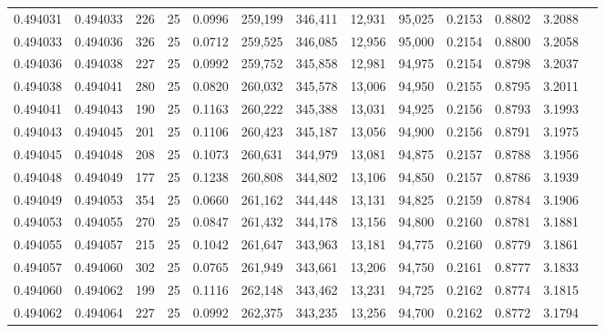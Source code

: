 \begin{tabular}{rrrrrrrrrrrrr}
0.494031 & 0.494033 &   226 &  25 &                                     0.0996 & 259,199 & 346,411 &  12,931 &  95,025 & 0.2153 & 0.8802 & 3.2088 \\
0.494033 & 0.494036 &   326 &  25 &                                     0.0712 & 259,525 & 346,085 &  12,956 &  95,000 & 0.2154 & 0.8800 & 3.2058 \\
0.494036 & 0.494038 &   227 &  25 &                                     0.0992 & 259,752 & 345,858 &  12,981 &  94,975 & 0.2154 & 0.8798 & 3.2037 \\
0.494038 & 0.494041 &   280 &  25 &                                     0.0820 & 260,032 & 345,578 &  13,006 &  94,950 & 0.2155 & 0.8795 & 3.2011 \\
0.494041 & 0.494043 &   190 &  25 &                                     0.1163 & 260,222 & 345,388 &  13,031 &  94,925 & 0.2156 & 0.8793 & 3.1993 \\
0.494043 & 0.494045 &   201 &  25 &                                     0.1106 & 260,423 & 345,187 &  13,056 &  94,900 & 0.2156 & 0.8791 & 3.1975 \\
0.494045 & 0.494048 &   208 &  25 &                                     0.1073 & 260,631 & 344,979 &  13,081 &  94,875 & 0.2157 & 0.8788 & 3.1956 \\
0.494048 & 0.494049 &   177 &  25 &                                     0.1238 & 260,808 & 344,802 &  13,106 &  94,850 & 0.2157 & 0.8786 & 3.1939 \\
0.494049 & 0.494053 &   354 &  25 &                                     0.0660 & 261,162 & 344,448 &  13,131 &  94,825 & 0.2159 & 0.8784 & 3.1906 \\
0.494053 & 0.494055 &   270 &  25 &                                     0.0847 & 261,432 & 344,178 &  13,156 &  94,800 & 0.2160 & 0.8781 & 3.1881 \\
0.494055 & 0.494057 &   215 &  25 &                                     0.1042 & 261,647 & 343,963 &  13,181 &  94,775 & 0.2160 & 0.8779 & 3.1861 \\
0.494057 & 0.494060 &   302 &  25 &                                     0.0765 & 261,949 & 343,661 &  13,206 &  94,750 & 0.2161 & 0.8777 & 3.1833 \\
0.494060 & 0.494062 &   199 &  25 &                                     0.1116 & 262,148 & 343,462 &  13,231 &  94,725 & 0.2162 & 0.8774 & 3.1815 \\
0.494062 & 0.494064 &   227 &  25 &                                     0.0992 & 262,375 & 343,235 &  13,256 &  94,700 & 0.2162 & 0.8772 & 3.1794 \\

\end{tabular}
